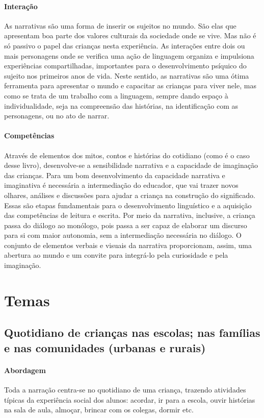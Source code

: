 \documentclass[11pt]{extarticle}
\begin{document}
\paragraph{Interação} As narrativas são uma forma de inserir os sujeitos no mundo. 
São elas que apresentam boa parte dos valores culturais da sociedade 
onde se vive. Mas não é só passivo o papel das crianças nesta experiência. 
As interações entre dois ou mais personagens onde se verifica
uma ação de linguagem organiza e impulsiona experiências compartilhadas,
importantes para o desenvolvimento psíquico do sujeito nos primeiros anos de vida.
Neste sentido, as narrativas são uma ótima ferramenta para
apresentar o mundo e capacitar as crianças para viver nele, mas como se
trata de um trabalho com a linguagem, sempre dando espaço à individualidade, 
seja na compreensão das histórias, na identificação com as personagens, ou 
no ato de narrar.

\paragraph{Competências} 
Através de elementos dos mitos, contos e histórias do cotidiano (como é o caso desse livro), desenvolve-se a sensibilidade narrativa e a capacidade de imaginação das crianças. Para um bom desenvolvimento da capacidade narrativa e imaginativa é necessária a intermediação do educador, que vai trazer novos olhares, análises e discussões para ajudar a criança na construção do significado. Essas são etapas fundamentais para o desenvolvimento linguístico e a aquisição das competências de leitura e escrita. Por meio da narrativa, inclusive, a criança passa do diálogo ao monólogo, pois passa a ser capaz de elaborar um discurso para si com maior autonomia, sem a intermediação necessária no diálogo.
O conjunto de elementos verbais e visuais da narrativa proporcionam, assim,
uma abertura ao mundo e um convite para integrá-lo pela curiosidade e pela imaginação.


\section{Temas}

\subsection{Quotidiano de crianças nas escolas; nas famílias e nas comunidades (urbanas e rurais)}

\paragraph{Abordagem} Toda a narração centra-se no quotidiano de uma criança, trazendo atividades típicas da experiência social dos alunos: acordar, ir para a escola, ouvir histórias na sala de aula, almoçar, brincar com os colegas, dormir etc.
\end{document}
